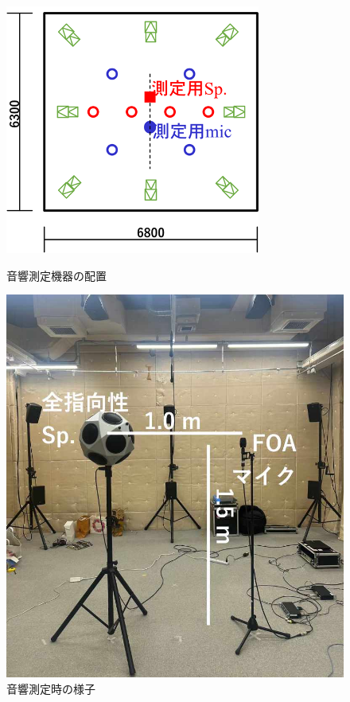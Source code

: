 \documentclass[11pt,a4j]{jreport}
\begin{document}
\begin{figure}[H]
  \begin{minipage}[b]{0.5\linewidth}
    \centering
    \includegraphics[width=.9\linewidth]{images/twoPiRoom/measureSetting.png}
    \caption{音響測定機器の配置}
    \label{fig:音響測定機器の配置}
  \end{minipage}%
  \begin{minipage}[b]{0.5\linewidth}
    \centering
    \includegraphics[width=.9\linewidth]{images/twoPiRoom/measureSettingPhotoResized.jpg}
    \caption{音響測定時の様子}
    \label{fig:音響測定時の様子}
  \end{minipage}
\end{figure}
\end{document}
